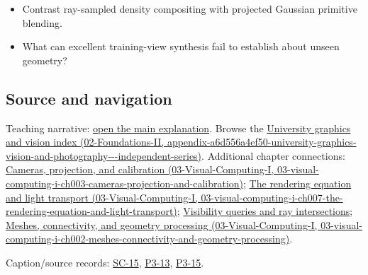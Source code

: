 \begin{itemize}
\tightlist
\item
  Contrast ray-sampled density compositing with projected Gaussian primitive blending.
\item
  What can excellent training-view synthesis fail to establish about unseen geometry?
\end{itemize}

\subsection{Source and navigation}\label{appendix-c5b332e400e7-source-and-navigation}

Teaching narrative: \hyperref[04-visual-computing-ii-ch034-learned-representations-of-3d-shape-and-scenes]{open the main explanation}. Browse the \href{../02-Foundations-II/main.pdf\#nameddest=appendix-a6d556a4ef50-university-graphics-vision-and-photography---independent-series}{University graphics and vision index (02-Foundations-II, appendix-a6d556a4ef50-university-graphics-vision-and-photography-\/-\/-independent-series)}. Additional chapter connections: \href{../03-Visual-Computing-I/main.pdf\#nameddest=03-visual-computing-i-ch003-cameras-projection-and-calibration}{Cameras, projection, and calibration (03-Visual-Computing-I, 03-visual-computing-i-ch003-cameras-projection-and-calibration)}; \href{../03-Visual-Computing-I/main.pdf\#nameddest=03-visual-computing-i-ch007-the-rendering-equation-and-light-transport}{The rendering equation and light transport (03-Visual-Computing-I, 03-visual-computing-i-ch007-the-rendering-equation-and-light-transport)}; \hyperref[04-visual-computing-ii-ch028-visibility-queries-and-ray-intersections-1]{Visibility queries and ray intersections}; \href{../03-Visual-Computing-I/main.pdf\#nameddest=03-visual-computing-i-ch002-meshes-connectivity-and-geometry-processing}{Meshes, connectivity, and geometry processing (03-Visual-Computing-I, 03-visual-computing-i-ch002-meshes-connectivity-and-geometry-processing)}.

Caption/source records: \hyperref[04-visual-computing-ii-ch036-sc-15---stanford-cs231n-deep-learning-for-computer-vision-spring-2025-lecture-15-3d-vision]{SC-15}, \hyperref[04-visual-computing-ii-ch036-p3-13---curves-and-surfaces]{P3-13}, \hyperref[04-visual-computing-ii-ch036-p3-15---ray-tracing]{P3-15}.
